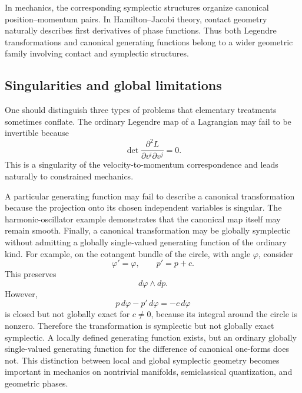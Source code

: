 In mechanics, the corresponding symplectic structures organize canonical
position–momentum pairs. In Hamilton–Jacobi theory, contact geometry naturally
describes first derivatives of phase functions. Thus both Legendre
transformations and canonical generating functions belong to a wider geometric
family involving contact and symplectic structures.

\subsection{ Singularities and global limitations}
One should distinguish three types of problems that elementary treatments
sometimes conflate.
The ordinary Legendre map of a Lagrangian may fail to be invertible because
\[
\det\frac{\partial^2L}{\partial v^i\partial v^j}=0.
\]
This is a singularity of the velocity-to-momentum correspondence and leads
naturally to constrained mechanics.

A particular generating function may fail to describe a canonical
transformation because the projection onto its chosen independent variables is
singular. The harmonic-oscillator example demonstrates that the canonical map
itself may remain smooth.
Finally, a canonical transformation may be globally symplectic without
admitting a globally single-valued generating function of the ordinary kind.
For example, on the cotangent bundle of the circle, with angle \(\varphi\),
consider
\[
\varphi'=\varphi,\qquad p'=p+c.
\]
This preserves
\[
d\varphi\wedge dp.
\]
However,
\[
p\,d\varphi-p'\,d\varphi=-c\,d\varphi
\]
is closed but not globally exact for \(c\ne0\), because its integral around the
circle is nonzero.
Therefore the transformation is symplectic but not globally exact symplectic.
A locally defined generating function exists, but an ordinary globally
single-valued generating function for the difference of canonical one-forms
does not.
This distinction between local and global symplectic geometry becomes important
in mechanics on nontrivial manifolds, semiclassical quantization, and geometric
phases.

